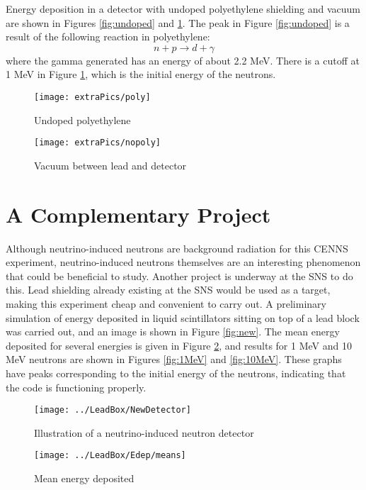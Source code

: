 \documentclass[12pt]{article}
\begin{document}
Energy deposition in a detector with undoped polyethylene shielding and vacuum are shown in Figures \ref{fig:undoped} and \ref{fig:vac}. The peak in Figure \ref{fig:undoped} is a result of the following reaction in polyethylene:
$$n + p \rightarrow d + \gamma$$
where the gamma generated has an energy of about 2.2 MeV. There is a cutoff at 1 MeV in Figure \ref{fig:vac}, which is the initial energy of the neutrons.

\begin{figure}[H]
  \centering
  \begin{minipage}[t]{0.45\linewidth}
    \texttt{[image: extraPics/poly]}
    \caption{Undoped polyethylene}
    \label{fig:undoped}
  \end{minipage}
  \quad
  \begin{minipage}[t]{0.45\linewidth}
    \texttt{[image: extraPics/nopoly]}
    \caption{Vacuum between lead and detector}
    \label{fig:vac}
  \end{minipage}
\end{figure}

\section{A Complementary Project}
Although neutrino-induced neutrons are background radiation for this CENNS experiment, neutrino-induced neutrons themselves are an interesting phenomenon that could be beneficial to study. Another project is underway at the SNS to do this. Lead shielding already existing at the SNS would be used as a target, making this experiment cheap and convenient to carry out. A preliminary simulation of energy deposited in liquid scintillators sitting on top of a lead block was carried out, and an image is shown in Figure \ref{fig:new}. The mean energy deposited for several energies is given in Figure \ref{fig:means}, and results for 1 MeV and 10 MeV neutrons are shown in Figures \ref{fig:1MeV} and \ref{fig:10MeV}. These graphs have peaks corresponding to the initial energy of the neutrons, indicating that the code is functioning properly.

\begin{figure}[H]
  \centering
  \begin{minipage}[t]{0.45\linewidth}
    \texttt{[image: ../LeadBox/NewDetector]}
    \caption{Illustration of a neutrino-induced neutron detector}
    \label{fig:new}
  \end{minipage}
  \quad
  \begin{minipage}[t]{0.45\linewidth}
  \texttt{[image: ../LeadBox/Edep/means]}
  \caption{Mean energy deposited}
  \label{fig:means}
  \end{minipage}
\end{figure}
\end{document}
